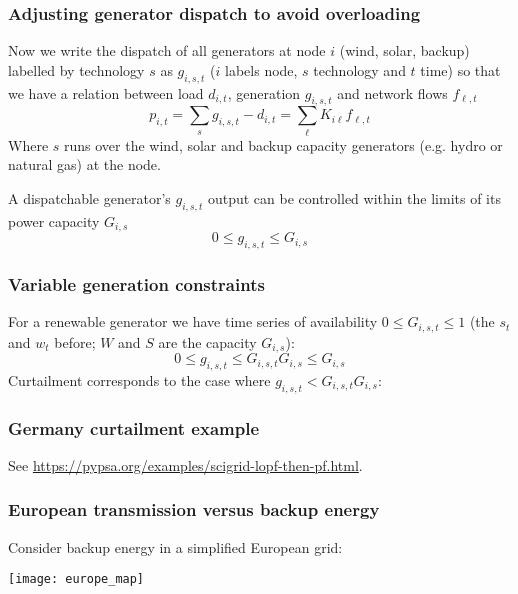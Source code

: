 \documentclass[10pt,dvipsnames]{beamer}
\begin{document}
\begin{frame}
  \frametitle{Adjusting generator dispatch to avoid overloading} Now
  we write the dispatch of all generators at node $i$ (wind, solar,
  backup) labelled by technology $s$ as $g_{i,s,t}$ ($i$ labels node, $s$ technology and $t$ time) so that we have a relation between load $d_{i,t}$, generation $g_{i,s,t}$ and network flows $f_{\ell,t}$
  \begin{equation*}
    p_{i,t} = \sum_{s} g_{i,s,t} - d_{i,t} = \sum_{\ell} K_{i\ell} f_{\ell,t}
  \end{equation*}
  Where $s$ runs over the wind, solar and backup capacity generators
  (e.g. hydro or natural gas) at the node.

  A dispatchable generator's $g_{i,s,t}$ output can be controlled
  within the limits of its power capacity $G_{i,s}$
  \begin{equation*}
      0 \leq g_{i,s,t} \leq  G_{i,s}
  \end{equation*}
\end{frame}



\begin{frame}
  \frametitle{Variable generation constraints}

  For a renewable generator we have time series of availability $0\leq G_{i,s,t}\leq 1$ (the $s_t$ and $w_t$ before; $W$ and $S$ are the capacity $G_{i,s}$):
    \begin{equation*}
      0 \leq g_{i,s,t} \leq G_{i,s,t} G_{i,s} \leq  G_{i,s}
    \end{equation*}
    Curtailment corresponds to the case where $g_{i,s,t} < G_{i,s,t} G_{i,s}$:


\end{frame}

\begin{frame}
  \frametitle{Germany curtailment example}

  See \url{https://pypsa.org/examples/scigrid-lopf-then-pf.html}.

\end{frame}


\begin{frame}
  \frametitle{European transmission versus backup energy}

  Consider backup energy in a simplified European grid:

  \centering
  \texttt{[image: europe\_map]}

\end{frame}
\end{document}
